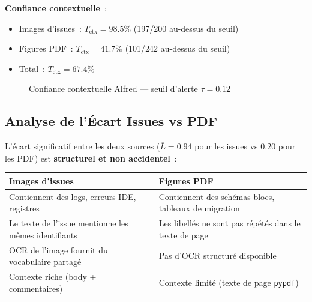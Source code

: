 \textbf{Confiance contextuelle}~:
\begin{itemize}
  \item Images d'issues~: $T_{\text{ctx}} = 98.5\%$ (197/200 au-dessus du seuil)
  \item Figures PDF~: $T_{\text{ctx}} = 41.7\%$ (101/242 au-dessus du seuil)
  \item Total~: $T_{\text{ctx}} = 67.4\%$
\end{itemize}

\begin{figure}[H]
\centering
{}
\caption{Confiance contextuelle Alfred --- seuil d'alerte $\tau = 0.12$}
\label{fig:alfred_trust_chart}
\end{figure}

\subsection{Analyse de l'Écart Issues vs PDF}
\label{sec:alfred_analyse_ecart}

L'écart significatif entre les deux sources ($\overline{L} = 0.94$ pour les issues vs $0.20$ pour les PDF) est \textbf{structurel et non accidentel}~:

\begin{longtable}{p{5.5cm}p{7cm}}
\toprule
\textbf{Images d'issues} & \textbf{Figures PDF} \\
\midrule
Contiennent des logs, erreurs IDE, registres & Contiennent des schémas blocs, tableaux de migration \\
Le texte de l'issue mentionne les mêmes identifiants & Les libellés ne sont pas répétés dans le texte de page \\
OCR de l'image fournit du vocabulaire partagé & Pas d'OCR structuré disponible \\
Contexte riche (body + commentaires) & Contexte limité (texte de page \texttt{pypdf}) \\
\bottomrule
\end{longtable}

